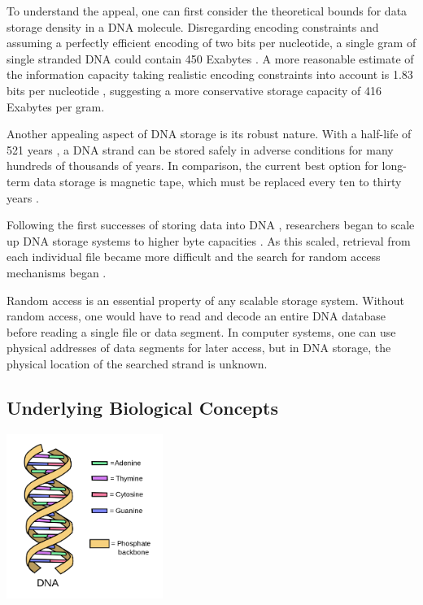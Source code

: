 \documentclass[a4paper,conference]{IEEEtran}
\begin{document}
To understand the appeal, one can first consider the theoretical bounds for data storage density in a DNA molecule. Disregarding encoding constraints and assuming a perfectly efficient encoding of two bits per nucleotide, a single gram of single stranded DNA could contain 450 Exabytes \cite{theoreticaldensity}. A more reasonable estimate of the information capacity taking realistic encoding constraints into account is 1.83 bits per nucleotide \cite{realistictheoreticaldensity}, suggesting a more conservative storage capacity of 416 Exabytes per gram. 


Another appealing aspect of DNA storage is its robust nature. With a half-life of 521 years \cite{dnabasedarchival}, a DNA strand can be stored safely in adverse conditions for many hundreds of thousands of years. In comparison, the current best option for long-term data storage is magnetic tape, which must be replaced every ten to thirty years \cite{dnabasedarchival}.

Following the first successes of storing data into DNA \cite{first,theoreticaldensity}, researchers began to scale up DNA storage systems to higher byte capacities \cite{dnabasedarchival}. As this scaled, retrieval from each individual file became more difficult \cite{dnabasedarchival} and the search for random access mechanisms began \cite{pcrbased2}. 

Random access is an essential property of any scalable storage system. Without random access, one would have to read and decode an entire DNA database before reading a single file or data segment. In computer systems, one can use physical addresses of data segments for later access, but in DNA storage, the physical location of the searched strand is unknown. 


\subsection{Underlying Biological Concepts}

\begin{center}
\includegraphics[width=2in]{dna}
\end{center}
\end{document}
